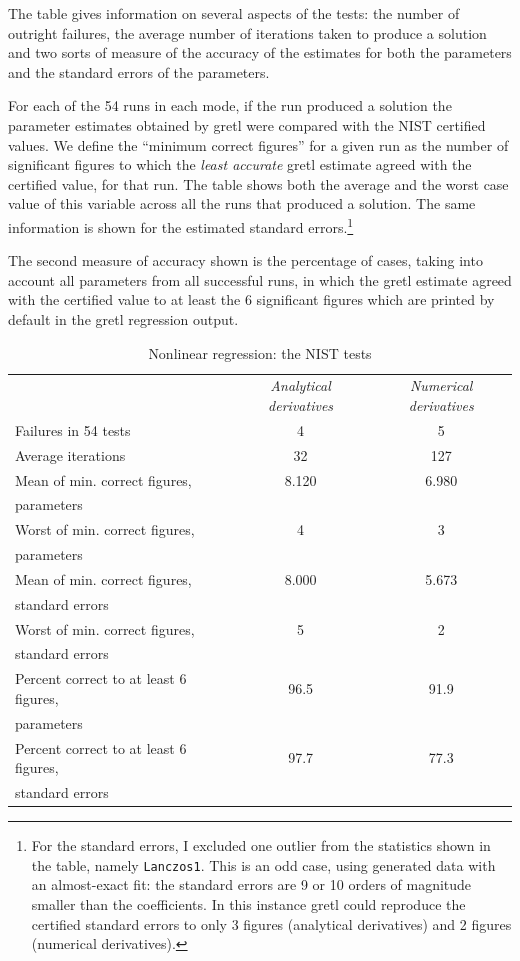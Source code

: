 The table gives information on several aspects of the tests: the
number of outright failures, the average number of iterations taken to
produce a solution and two sorts of measure of the accuracy of the
estimates for both the parameters and the standard errors of the
parameters.

For each of the 54 runs in each mode, if the run produced a solution
the parameter estimates obtained by gretl were compared with the
NIST certified values.  We define the ``minimum correct figures'' for
a given run as the number of significant figures to which the
\emph{least accurate} gretl estimate agreed with the certified
value, for that run. The table shows both the average and the worst
case value of this variable across all the runs that produced a
solution.  The same information is shown for the estimated standard
errors.\footnote{For the standard errors, I excluded one outlier from
  the statistics shown in the table, namely \verb+Lanczos1+.  This is
  an odd case, using generated data with an almost-exact fit: the
  standard errors are 9 or 10 orders of magnitude smaller than the
  coefficients.  In this instance gretl could reproduce the
  certified standard errors to only 3 figures (analytical derivatives)
  and 2 figures (numerical derivatives).}  

The second measure of accuracy shown is the percentage of cases,
taking into account all parameters from all successful runs, in which
the gretl estimate agreed with the certified value to at least
the 6 significant figures which are printed by default in the
gretl regression output.

\begin{table}[htbp]
 \caption{Nonlinear regression: the NIST tests}
 \label{tab-nls}
  \begin{center}
    \begin{tabular}{lcc}
        & \textit{Analytical derivatives} & 
          \textit{Numerical derivatives} \\ [4pt]
        Failures in 54 tests & 4 & 5\\
        Average iterations & 32 & 127\\
        Mean of min. correct figures, & 8.120 & 6.980\\
        parameters \\
        Worst of min. correct figures, & 4 & 3\\
        parameters \\
        Mean of min. correct figures, & 8.000 & 5.673\\
        standard errors \\
        Worst of min. correct figures, & 5 & 2\\
        standard errors \\
        Percent correct to at least 6 figures, & 96.5 & 91.9\\
        parameters \\
        Percent correct to at least 6 figures, & 97.7 & 77.3\\
        standard errors \\
      \end{tabular}
    \end{center}
  \end{table}

